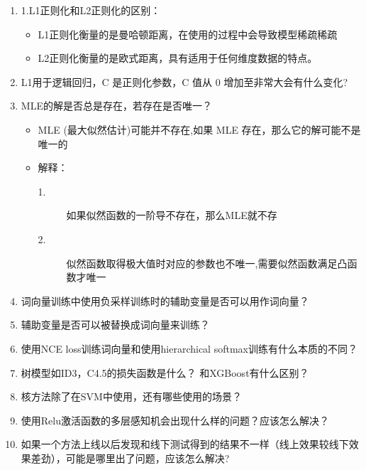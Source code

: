 \documentclass[UTF8]{article}%
\begin{document}
\begin{enumerate}
		\item 1.L1正则化和L2正则化的区别：
			\begin{itemize}
				\item 	L1正则化衡量的是曼哈顿距离，在使用的过程中会导致模型稀疏稀疏
				\item 	L2正则化衡量的是欧式距离，具有适用于任何维度数据的特点。
			\end{itemize}
		\item L1用于逻辑回归，C 是正则化参数，C 值从 0 增加至非常大会有什么变化?
		\item MLE的解是否总是存在，若存在是否唯一？
			\begin{itemize}
				\item 	MLE (最大似然估计)可能并不存在,如果 MLE 存在，那么它的解可能不是唯一的
				\item 解释：
					\begin{description}
						\item[1.] 如果似然函数的一阶导不存在，那么MLE就不存
						\item[2.] 似然函数取得极大值时对应的参数也不唯一,需要似然函数满足凸函数才唯一
					\end{description}
			\end{itemize}
		\item 词向量训练中使用负采样训练时的辅助变量是否可以用作词向量？ 
		\item 辅助变量是否可以被替换成词向量来训练？
		\item 使用NCE loss训练词向量和使用hierarchical softmax训练有什么本质的不同？
		\item 树模型如ID3，C4.5的损失函数是什么？ 和XGBoost有什么区别？
		\item 核方法除了在SVM中使用，还有哪些使用的场景？
		\item 使用Relu激活函数的多层感知机会出现什么样的问题？应该怎么解决？
		\item 如果一个方法上线以后发现和线下测试得到的结果不一样（线上效果较线下效果差劲），可能是哪里出了问题，应该怎么解决?
		\end{enumerate}
\end{document}
